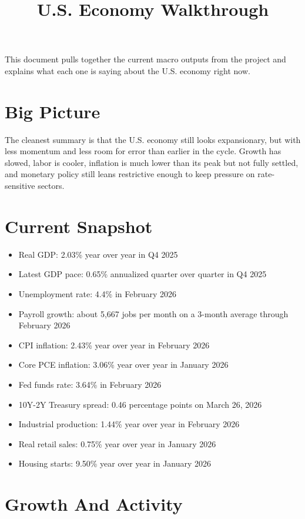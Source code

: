 \documentclass[11pt]{article}
\title{U.S. Economy Walkthrough}
\author{}
\date{}
\begin{document}
\maketitle

This document pulls together the current macro outputs from the project and explains what each one is saying about the U.S. economy right now.

\section*{Big Picture}

The cleanest summary is that the U.S. economy still looks expansionary, but with less momentum and less room for error than earlier in the cycle. Growth has slowed, labor is cooler, inflation is much lower than its peak but not fully settled, and monetary policy still leans restrictive enough to keep pressure on rate-sensitive sectors.

\section*{Current Snapshot}

\begin{itemize}
  \item Real GDP: 2.03\% year over year in Q4 2025
  \item Latest GDP pace: 0.65\% annualized quarter over quarter in Q4 2025
  \item Unemployment rate: 4.4\% in February 2026
  \item Payroll growth: about 5,667 jobs per month on a 3-month average through February 2026
  \item CPI inflation: 2.43\% year over year in February 2026
  \item Core PCE inflation: 3.06\% year over year in January 2026
  \item Fed funds rate: 3.64\% in February 2026
  \item 10Y-2Y Treasury spread: 0.46 percentage points on March 26, 2026
  \item Industrial production: 1.44\% year over year in February 2026
  \item Real retail sales: 0.75\% year over year in January 2026
  \item Housing starts: 9.50\% year over year in January 2026
\end{itemize}

\section*{Growth And Activity}
\end{document}
